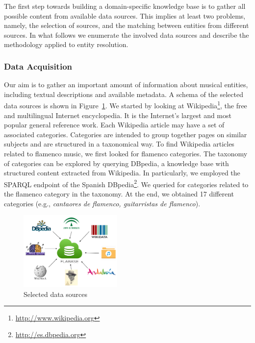The first step towards building a domain-specific knowledge base is to gather all possible content from available data sources. This implies at least two problems, namely, the selection of sources, and the matching between entities from different sources. In what follows we enumerate the involved data sources and describe the methodology applied to entity resolution.

\subsubsection{Data Acquisition}\label{sec:musicology:datasoruces}

Our aim is to gather an important amount of information about musical entities, including textual descriptions and available metadata. A schema of the selected data sources is shown in Figure~\ref{fig:musicology:datasources}. We started by looking at Wikipedia\footnote{\url{http://www.wikipedia.org}}, the free and multilingual Internet encyclopedia. It is the Internet's largest and most popular general reference work. Each Wikipedia article may have a set of associated categories. Categories are intended to group together pages on similar subjects and are structured in a taxonomical way. To find Wikipedia articles related to flamenco music, we first looked for flamenco categories. The taxonomy of categories can be explored by querying DBpedia, a knowledge base with structured content extracted from Wikipedia. In particularly, we employed the SPARQL endpoint of the Spanish DBpedia\footnote{\url{http://es.dbpedia.org}}. We queried for categories related to the flamenco category in the taxonomy. At the end, we obtained 17 different categories (e.g., \textit{cantaores de flamenco, guitarristas de flamenco}).

\begin{figure}
	\centering
	\includegraphics[width=0.45\textwidth]{ch05_musicology/pics/datasources.png}
	\caption{Selected data sources \label{fig:musicology:datasources}}
\end{figure}

